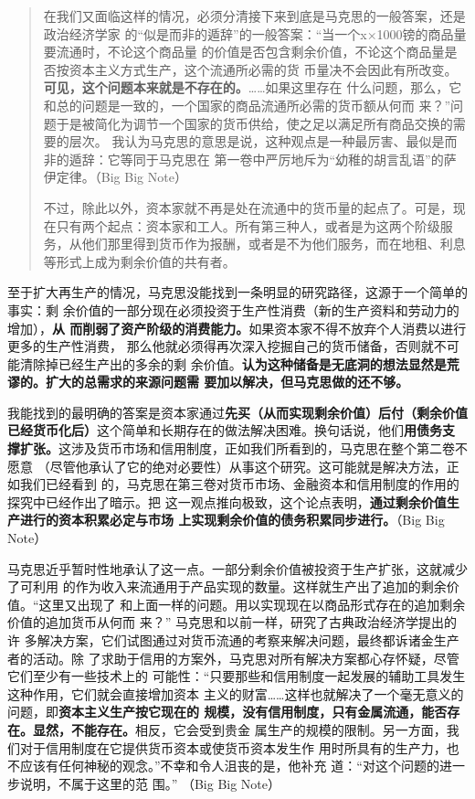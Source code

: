 \begin{quotation}
在我们又面临这样的情况，必须分清接下来到底是马克思的一般答案，还是政治经济学家
的“似是而非的遁辞”的一般答案：“当一个x×1000镑的商品量要流通时，不论这个商品量
的价值是否包含剩余价值，不论这个商品量是否按资本主义方式生产，这个流通所必需的货
币量决不会因此有所改变。\textbf{可见，这个问题本来就是不存在的。}……如果这里存在
什么问题，那么，它和总的问题是一致的，一个国家的商品流通所必需的货币额从何而
来？”问题于是被简化为调节一个国家的货币供给，使之足以满足所有商品交换的需要的层次。
我认为马克思的意思是说，这种观点是一种最厉害、最似是而非的遁辞：它等同于马克思在
第一卷中严厉地斥为“幼稚的胡言乱语”的萨伊定律。（Big Big Note）

不过，除此以外，资本家就不再是处在流通中的货币量的起点了。可是，现在只有两个起点：资本家和工人。所有第三种人，或者是为这两个阶级服务，从他们那里得到货币作为报酬，或者是不为他们服务，而在地租、利息等形式上成为剩余价值的共有者。 


\end{quotation}

至于扩大再生产的情况，马克思没能找到一条明显的研究路径，这源于一个简单的事实：剩
余价值的一部分现在必须投资于生产性消费（新的生产资料和劳动力的增加），\textbf{从
  而削弱了资产阶级的消费能力。}如果资本家不得不放弃个人消费以进行更多的生产性消费，
那么他就必须得再次深入挖掘自己的货币储备，否则就不可能清除掉已经生产出的多余的剩
余价值。\textbf{认为这种储备是无底洞的想法显然是荒谬的。扩大的总需求的来源问题需
  要加以解决，但马克思做的还不够。}

我能找到的最明确的答案是资本家通过\textbf{先买（从而实现剩余价值）后付（剩余价值
  已经货币化后）}这个简单和长期存在的做法解决困难。换句话说，他们\textbf{用债务支
  撑扩张。}这涉及货币市场和信用制度，正如我们所看到的，马克思在整个第二卷不愿意
（尽管他承认了它的绝对必要性）从事这个研究。这可能就是解决方法，正如我们已经看到
的，马克思在第三卷对货币市场、金融资本和信用制度的作用的探究中已经作出了暗示。把
这一观点推向极致，这个论点表明，\textbf{通过剩余价值生产进行的资本积累必定与市场
  上实现剩余价值的债务积累同步进行。}（Big Big Note）

马克思近乎暂时性地承认了这一点。一部分剩余价值被投资于生产扩张，这就减少了可利用
的作为收入来流通用于产品实现的数量。这样就生产出了追加的剩余价值。“这里又出现了
和上面一样的问题。用以实现现在以商品形式存在的追加剩余价值的追加货币从何而
来？” 马克思和以前一样，研究了古典政治经济学提出的许
多解决方案，它们试图通过对货币流通的考察来解决问题，最终都诉诸金生产者的活动。除
了求助于信用的方案外，马克思对所有解决方案都心存怀疑，尽管它们至少有一些技术上的
可能性：“只要那些和信用制度一起发展的辅助工具发生这种作用，它们就会直接增加资本
主义的财富……这样也就解决了一个毫无意义的问题，即\textbf{资本主义生产按它现在的
  规模，没有信用制度，只有金属流通，能否存在。显然，不能存在。}相反，它会受到贵金
属生产的规模的限制。另一方面，我们对于信用制度在它提供货币资本或使货币资本发生作
用时所具有的生产力，也不应该有任何神秘的观念。”不幸和令人沮丧的是，他补充
道：“对这个问题的进一步说明，不属于这里的范
围。” （Big Big Note）

